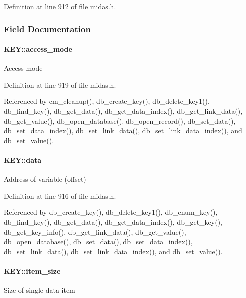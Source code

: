 Definition at line 912 of file midas.h.

\subsubsection{Field Documentation}
\paragraph[{access\_\-mode}]{ {\bf KEY::access\_\-mode}}\hfill\label{structKEY_a68512ae899ef674617e67dbe51a71c7a}
Access mode 

Definition at line 919 of file midas.h.

Referenced by cm\_\-cleanup(), db\_\-create\_\-key(), db\_\-delete\_\-key1(), db\_\-find\_\-key(), db\_\-get\_\-data(), db\_\-get\_\-data\_\-index(), db\_\-get\_\-link\_\-data(), db\_\-get\_\-value(), db\_\-open\_\-database(), db\_\-open\_\-record(), db\_\-set\_\-data(), db\_\-set\_\-data\_\-index(), db\_\-set\_\-link\_\-data(), db\_\-set\_\-link\_\-data\_\-index(), and db\_\-set\_\-value().
\paragraph[{data}]{ {\bf KEY::data}}\hfill\label{structKEY_affecbc127d0afea9ac19ed64600760a4}
Address of variable (offset) 

Definition at line 916 of file midas.h.

Referenced by db\_\-create\_\-key(), db\_\-delete\_\-key1(), db\_\-enum\_\-key(), db\_\-find\_\-key(), db\_\-get\_\-data(), db\_\-get\_\-data\_\-index(), db\_\-get\_\-key(), db\_\-get\_\-key\_\-info(), db\_\-get\_\-link\_\-data(), db\_\-get\_\-value(), db\_\-open\_\-database(), db\_\-set\_\-data(), db\_\-set\_\-data\_\-index(), db\_\-set\_\-link\_\-data(), db\_\-set\_\-link\_\-data\_\-index(), and db\_\-set\_\-value().
\paragraph[{item\_\-size}]{ {\bf KEY::item\_\-size}}\hfill\label{structKEY_acd1951fdb8bf0dec79ef833f6dec9276}
Size of single data item 

